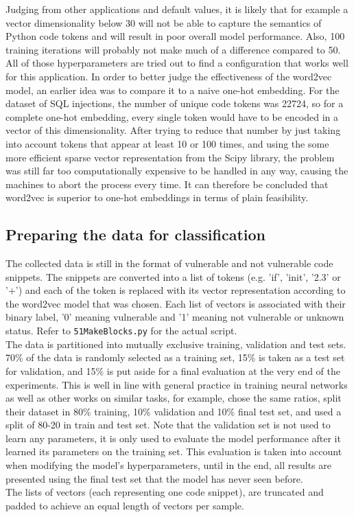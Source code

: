 \documentclass[
	a4paper,
	pagesize,
	pdftex,
	12pt,
	twoside, %
	BCOR=5mm, %
	ngerman,
	fleqn,
	final,
	]{scrartcl}
\begin{document}
Judging from other applications and default values, it is likely that for example a vector dimensionality below 30 will not be able to capture the semantics of Python code tokens and will result in poor overall model performance. Also, 100 training iterations will probably not make much of a difference compared to 50. All of those hyperparameters are tried out to find a configuration that works well for this application.
In order to better judge the effectiveness of the word2vec model, an earlier idea was to compare it to a naive one-hot embedding. For the dataset of SQL injections, the number of unique code tokens was 22724, so for a complete one-hot embedding, every single token would have to be encoded in a vector of this dimensionality. After trying to reduce that number by just taking into account tokens that appear at least 10 or 100 times, and using the some more efficient sparse vector representation from the Scipy library, the problem was still far too computationally expensive to be handled in any way, causing the machines to abort the process every time. It can therefore be concluded that word2vec is superior to one-hot embeddings in terms of plain feasibility.



\subsection{Preparing the data for classification}
The collected data is still in the format of vulnerable and not vulnerable code snippets. The snippets are converted into a list of tokens (e.g. 'if', 'init', '2.3' or '+') and each of the token is replaced with its vector representation according to the word2vec model that was chosen. Each list of vectors is associated with their binary label, '0' meaning vulnerable and '1' meaning not vulnerable or unknown status. Refer to \texttt{51MakeBlocks.py} for the actual script.\\
The data is partitioned into mutually exclusive training, validation and test sets. 70\% of the data is randomly selected as a training set, 15\% is taken as a test set for validation, and 15\% is put aside for a final evaluation at the very end of the experiments. This is well in line with general practice in training neural networks as well as other works on similar tasks, for example, \cite{Dam.2016} chose the same ratios, \cite{Russell.2018} split their dataset in 80\% training, 10\% validation and 10\% final test set, and \cite{Li.2018} used a split of 80-20 in train and test set. Note that the validation set is not used to learn any parameters, it is only used to evaluate the model performance after it learned its parameters on the training set. This evaluation is taken into account when modifying the model's hyperparameters, until in the end, all results are presented using the final test set that the model has never seen before.\\
The lists of vectors (each representing one code snippet), are truncated and padded to achieve an equal length of vectors per sample.
\end{document}
